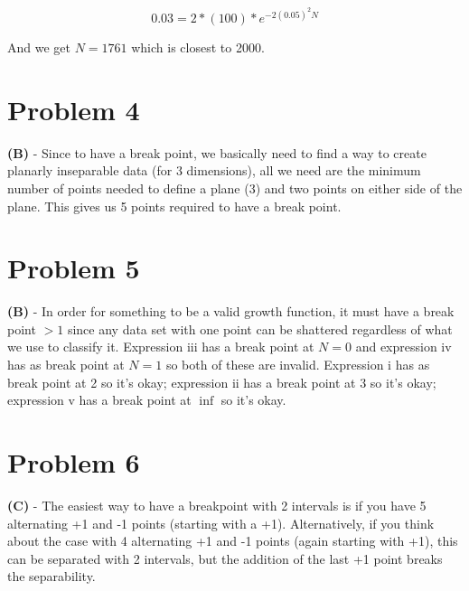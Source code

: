 \documentclass[10pt,letter]{article}
\begin{document}
\begin{equation}
0.03 = 2*(100)*e^{-2 (0.05) ^{2} N}
\end{equation}

And we get $N = 1761$ which is closest to 2000.

\section*{Problem 4}

\textbf{(B)} - Since to have a break point, we basically need to find a way to create planarly inseparable data (for 3 dimensions), all we need are the minimum number of points needed to define a plane (3) and two points on either side of the plane. This gives us 5 points required to have a break point.

\section*{Problem 5}

\textbf{(B)} - In order for something to be a valid growth function, it must have a break point $> 1$ since any data set with one point can be shattered regardless of what we use to classify it. Expression iii has a break point at $N=0$ and expression iv has as break point at $N=1$ so both of these are invalid. Expression i has as break point at 2 so it's okay; expression ii has a break point at 3 so it's okay; expression v has a break point at $\inf$ so it's okay.

\section*{Problem 6}


\textbf{(C)} - The easiest way to have a breakpoint with 2 intervals is if you have 5 alternating +1 and -1 points (starting with a +1). Alternatively, if you think about the case with 4 alternating +1 and -1 points (again starting with +1), this can be separated with 2 intervals, but the addition of the last +1 point breaks the separability.
\end{document}

